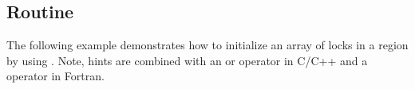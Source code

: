 \subsection{ Routine}
\label{subsec:init_lock_with_hint}

The following example demonstrates how to initialize an array of locks in a  region by using .
Note, hints are combined with an \code{|} or \code{+} operator in C/C++ and a \code{+} operator in Fortran.


